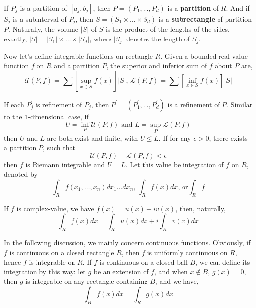 \documentclass[a4paper]{article}
\numberwithin{equation}{subsection}
\begin{document}
\par If $P_j$ is a partition of $[a_j, b_j]$, then $P = (P_1, \dots, P_d)$ is a \textbf{partition} of $R$. And if $S_j$ is a subinterval of $P_j$, then $S=(S_1 \times \dots \times S_d)$ is a \textbf{subrectangle} of partition $P$. Naturally, the volume $\lvert S \rvert$ of $S$ is the product of the lengths of the sides, exactly, $\lvert S \rvert=\lvert S_1 \rvert \times \dots \times \lvert S_d \rvert$, where $\lvert S_j \rvert$ denotes the length of $S_j$.

\par Now let's define integrable functions on rectangle $R$. Given a bounded real-value function $f$ on $R$ and a partition $P$, the superior and inferior sum of $f$ about $P$ are,
\begin{equation}
    \mathcal{U}(P, f) = \sum [\sup_{x\in S} f(x)]\lvert S \rvert \text{, } \mathcal{L}(P, f) = \sum [\inf_{x\in S} f(x)] \lvert S \rvert
\end{equation}

\par If each $P_j^\prime$ is refinement of $P_j$, then $P^\prime = (P_1^\prime, \dots, P_d^\prime)$ is a refinement of $P$. Similar to the 1-dimensional case, if
\begin{equation}
    U = \inf_{P}\mathcal{U}(P, f) \text{ and } L = \sup_{P}\mathcal{L}(P, f)
\end{equation}
then $U$ and $L$ are both exist and finite, with $U \leq L$. If for any $\epsilon>0$, there exists a partition $P$, such that
\begin{equation}
    \mathcal{U}(P, f) - \mathcal{L}(P, f) < \epsilon
\end{equation}
then $f$ is Riemann integrable and $U=L$. Let this value be integration of $f$ on $R$, denoted by
\begin{equation}
    \int_R f(x_1, \dots, x_n) dx_1 \dots dx_n \text{, } \int_R f(x)dx \text{, or} \int_R f
\end{equation}

\par If $f$ is complex-value, we have $f(x) = u(x) + iv(x)$, then, naturally,
\begin{equation}
    \int_R f(x)dx = \int_R u(x)dx + i\int_R v(x)dx
\end{equation}

\par In the following discussion, we mainly concern continuous functions. Obviously, if $f$ is continuous on a closed rectangle $R$, then $f$ is uniformly continuous on $R$, hence $f$ is integrable on $R$. If $f$ is continuous on a closed ball $B$, we can define its integration by this way: let $g$ be an extension of $f$, and when $x \notin B$, $g(x)=0$, then $g$ is integrable on any rectangle containing $B$, and we have,
\begin{equation}
    \int_B f(x)dx = \int_R g(x)dx
\end{equation}
\end{document}
